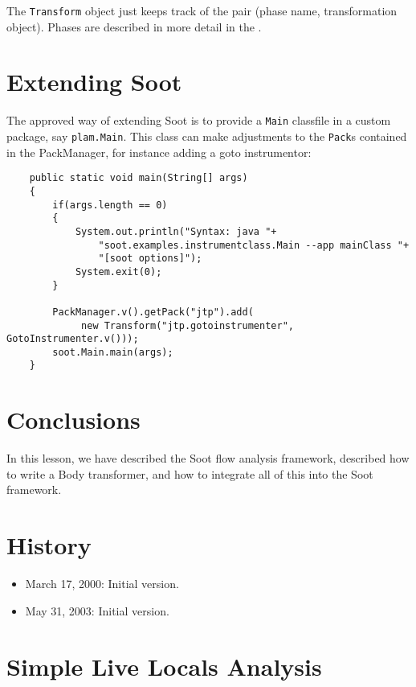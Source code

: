 \documentclass{article}
\begin{document}
The {\tt Transform} object just keeps track of the pair (phase name,
transformation object).  Phases are described in more detail in the
.

\section{Extending Soot}

The approved way of extending Soot is to provide a {\tt Main} classfile
in a custom package, say {\tt plam.Main}.  This class can make adjustments
to the {\tt Pack}s contained in the PackManager, for instance adding a
goto instrumentor:

\begin{verbatim}
    public static void main(String[] args) 
    {
        if(args.length == 0)
        {
            System.out.println("Syntax: java "+
                "soot.examples.instrumentclass.Main --app mainClass "+
                "[soot options]");
            System.exit(0);
        }            
        
        PackManager.v().getPack("jtp").add(
             new Transform("jtp.gotoinstrumenter", GotoInstrumenter.v()));
        soot.Main.main(args);
    }
\end{verbatim}

\section{Conclusions}

In this lesson, we have described the Soot flow analysis framework,
described how to write a Body transformer, and how to integrate all of
this into the Soot framework.

\section{History}

\begin{itemize}
\item March 17, 2000: Initial version.
\item May 31, 2003: Initial version.
\end{itemize}

\appendix

\section*{Simple Live Locals Analysis}
\label{simpleAnalysis}
\end{document}
